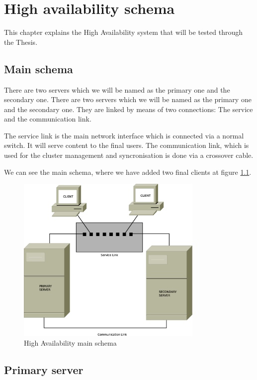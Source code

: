 

\chapter{High availability schema}
\label{chap:ha-schema}
This chapter explains the High Availability system that will be tested through the Thesis. 

\section {Main schema}
There are two servers which we will be named as the primary one and the secondary one. There are two servers which we will be named as the primary one and the secondary one. They are linked by means of two connections: The service and the communication link.

The service link is the main network interface which is connected via a normal switch. It will serve content to the final users. The communication link, which is used for the cluster management and syncronisation is done via a crossover cable.

We can see the main schema, where we have added two final clients at figure \ref{fig:main-schema}.

\begin{figure}
  \centering
    \includegraphics[width=0.8\textwidth]{img/ha_main_schema.eps}
  \caption{High Availability main schema}
  \label{fig:main-schema}
\end{figure}

\section {Primary server}
